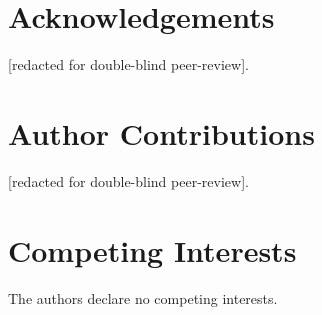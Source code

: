 \documentclass[twocolumn,10pt]{article}
\begin{document}
\section{Acknowledgements}
[redacted for double-blind peer-review].

\section{Author Contributions}
[redacted for double-blind peer-review].

\section{Competing Interests}
The authors declare no competing interests.



\end{document}
